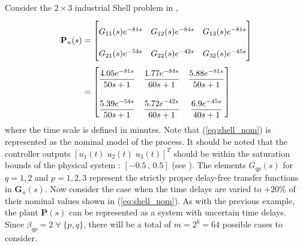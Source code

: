 \documentclass[A4, 10pt, conference]{ieeeconf}
\renewcommand{\vec}[1]{\mathbf{#1}}
\begin{document}
Consider the $2 \times 3$ industrial Shell problem in \cite{RC06}, 
\begin{align}\label{eq:shell_nom}
\renewcommand{\arraystretch}{2.2}
\vec{P}_n(s)&=
\begin{bmatrix}
         G_{11}(s)e^{-81s} & G_{12}(s)e^{-84s} & G_{13}(s)e^{-81s}\\
         G_{21}(s)e^{-54s} & G_{22}(s)e^{-42s} & G_{32}(s)e^{-45s}
\end{bmatrix} \nonumber\\
&=
\begin{bmatrix}
         \dfrac{4.05e^{-81s}}{50s+1} & \dfrac{1.77e^{-84s}}{60s+1} & \dfrac{5.88e^{-81s}}{50s+1}\\[1em]
         \dfrac{5.39e^{-54s}}{50s+1} & \dfrac{5.72e^{-42s}}{60s+1} & \dfrac{6.9e^{-45s}}{40s+1}
\end{bmatrix}
\end{align}
where the time scale is defined in minutes. Note that (\ref{eq:shell_nom}) is represented as the nominal model of the process. 
It should be noted that the controller outputs $[u_1(t) \; u_2(t) \; u_3(t)]^T$ should be within the saturation bounds of the physical system : $[-0.5 \, , \, 0.5]$ (see \cite{VWG02}). 
The elements $G_{qp}(s)$ for $q=1,2$ and $p=1,2,3$ represent the strictly proper delay-free transfer functions in $\vec{G}_n(s)$. Now consider the case when the time delays are varied to $+20\%$ of their nominal values shown in (\ref{eq:shell_nom}). As with the previous example, the plant $\vec{P}(s)$ can be represented as a system with uncertain time delays. Since $\beta_{qp}=2 \; \forall \; \{p,q\}$, there will be a total of $m=2^6=64$ possible cases to consider.%
\end{document}
